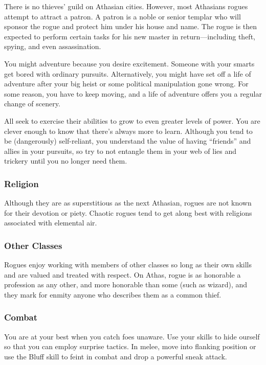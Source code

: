 There is no thieves' guild on Athasian cities. However, most Athasians rogues attempt to attract a patron. A patron is a noble or senior templar who will sponsor the rogue and protect him under his house and name. The rogue is then expected to perform certain tasks for his new master in return---including theft, spying, and even assassination.

You might adventure because you desire excitement. Someone with your smarts get bored with ordinary pursuits. Alternatively, you might have set off a life of adventure after your big heist or some political manipulation gone wrong. For some reason, you have to keep moving, and a life of adventure offers you a regular change of scenery.

All seek to exercise their abilities to grow to even greater levels of power. You are clever enough to know that there's always more to learn. Although you tend to be (dangerously) self-reliant, you understand the value of having ``friends'' and allies in your pursuits, so try to not entangle them in your web of lies and trickery until you no longer need them.

\subsubsection{Religion}

Although they are as superstitious as the next Athasian, rogues are not known for their devotion or piety. Chaotic rogues tend to get along best with religions associated with elemental air.

\subsubsection{Other Classes}

Rogues enjoy working with members of other classes so long as their own skills and are valued and treated with respect. On Athas, rogue is as honorable a profession as any other, and more honorable than some (such as
wizard), and they mark for enmity anyone who describes them as a common thief.

\subsubsection{Combat}

You are at your best when you catch foes unaware. Use your skills to hide ourself so that you can employ surprise tactics. In melee, move into flanking position or use the Bluff skill to feint in combat and drop a powerful sneak attack.

